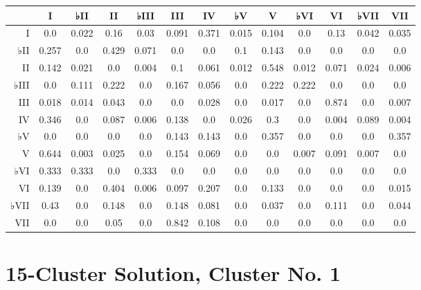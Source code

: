 \begin{table}[htbp]
\begin{minipage}{\linewidth}
\setlength{\tymax}{0.5\linewidth}
\centering
\small
\begin{tabulary}{\textwidth}{@{}RCCCCCCCCCCCC@{}} \toprule
&I&♭II&II&♭III&III&IV&♭V&V&♭VI&VI&♭VII&VII\\
\midrule
I&0.0&0.022&0.16&0.03&0.091&0.371&0.015&0.104&0.0&0.13&0.042&0.035\\
♭II&0.257&0.0&0.429&0.071&0.0&0.0&0.1&0.143&0.0&0.0&0.0&0.0\\
II&0.142&0.021&0.0&0.004&0.1&0.061&0.012&0.548&0.012&0.071&0.024&0.006\\
♭III&0.0&0.111&0.222&0.0&0.167&0.056&0.0&0.222&0.222&0.0&0.0&0.0\\
III&0.018&0.014&0.043&0.0&0.0&0.028&0.0&0.017&0.0&0.874&0.0&0.007\\
IV&0.346&0.0&0.087&0.006&0.138&0.0&0.026&0.3&0.0&0.004&0.089&0.004\\
♭V&0.0&0.0&0.0&0.0&0.143&0.143&0.0&0.357&0.0&0.0&0.0&0.357\\
V&0.644&0.003&0.025&0.0&0.154&0.069&0.0&0.0&0.007&0.091&0.007&0.0\\
♭VI&0.333&0.333&0.0&0.333&0.0&0.0&0.0&0.0&0.0&0.0&0.0&0.0\\
VI&0.139&0.0&0.404&0.006&0.097&0.207&0.0&0.133&0.0&0.0&0.0&0.015\\
♭VII&0.43&0.0&0.148&0.0&0.148&0.081&0.0&0.037&0.0&0.111&0.0&0.044\\
VII&0.0&0.0&0.05&0.0&0.842&0.108&0.0&0.0&0.0&0.0&0.0&0.0\\

\bottomrule

\end{tabulary}
\end{minipage}
\end{table}

\section{15-Cluster Solution, Cluster No. 1}
\label{15-clustersolutionclusterno.1}


